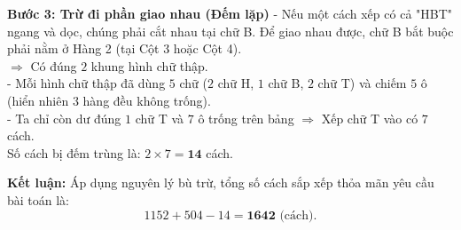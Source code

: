 \begin{ex}
{		\textbf{Bước 3: Trừ đi phần giao nhau (Đếm lặp)}
		- Nếu một cách xếp có cả "HBT" ngang và dọc, chúng phải cắt nhau tại chữ B. Để giao nhau được, chữ B bắt buộc phải nằm ở Hàng 2 (tại Cột 3 hoặc Cột 4).
		\\ $\Rightarrow$ Có đúng $2$ khung hình chữ thập.
		\\ - Mỗi hình chữ thập đã dùng $5$ chữ ($2$ chữ H, $1$ chữ B, $2$ chữ T) và chiếm $5$ ô (hiển nhiên $3$ hàng đều không trống).
		\\ - Ta chỉ còn dư đúng $1$ chữ T và $7$ ô trống trên bảng $\Rightarrow$ Xếp chữ T vào có $7$ cách.
		\\ Số cách bị đếm trùng là: $2 \times 7 = \textbf{14}$ cách.
		
		\textbf{Kết luận:} Áp dụng nguyên lý bù trừ, tổng số cách sắp xếp thỏa mãn yêu cầu bài toán là:
		\[ 1152 + 504 - 14 = \mathbf{1642} \text{ (cách).} \]
	}
\end{ex}

